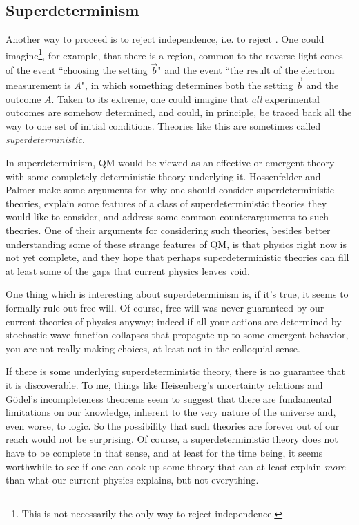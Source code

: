 \subsection{Superdeterminism}

Another way to proceed is to reject independence, i.e. to reject
. One could imagine\footnote{This is not necessarily
the only way to reject independence.}, for example, that there
is a region, common to the reverse light cones of the event ``choosing the
setting $\vec{b}$" and the event ``the result of the electron measurement
is $A$", in which something determines both the setting $\vec{b}$ and
the outcome $A$. Taken to its extreme, one could imagine that {\it all}
experimental outcomes are somehow determined, and could, in principle, be
traced back all the way to one set of initial conditions. Theories like
this are sometimes called {\it superdeterministic}.

In superdeterminism, QM would be viewed as an effective or emergent theory
with some completely deterministic theory underlying it. Hossenfelder
and Palmer \cite{hossenfelder_rethinking_2020} make some arguments for
why one should consider superdeterministic theories, explain some features
of a class of superdeterministic theories they would like to consider, and
address some common counterarguments to such theories. One of their arguments
for considering such theories, besides better understanding some of these
strange features of QM, is that physics right now is not yet complete,
and they hope that perhaps superdeterministic theories can fill at least
some of the gaps that current physics leaves void.

One thing which is interesting about superdeterminism is, if it's true,
it seems to formally rule out free will. Of course, free will was never
guaranteed by our current theories of physics anyway; indeed if all your
actions are determined by stochastic wave function collapses that 
propagate up to some emergent behavior, you are not really making
choices, at least not in the colloquial sense.

If there is some underlying superdeterministic theory, there is no guarantee
that it is discoverable. To me, things like Heisenberg's uncertainty relations
and G\"odel's incompleteness theorems seem to suggest that there are
fundamental limitations on our knowledge, inherent to the very nature of
the universe and, even worse, to logic. So the possibility that such theories
are forever out of our reach would not be surprising. Of course, a
superdeterministic theory does not have to be complete in that sense, and 
at least for the time being, it seems worthwhile to see if one can cook up
some theory that can at least explain {\it more} than what our current
physics explains, but not everything.






